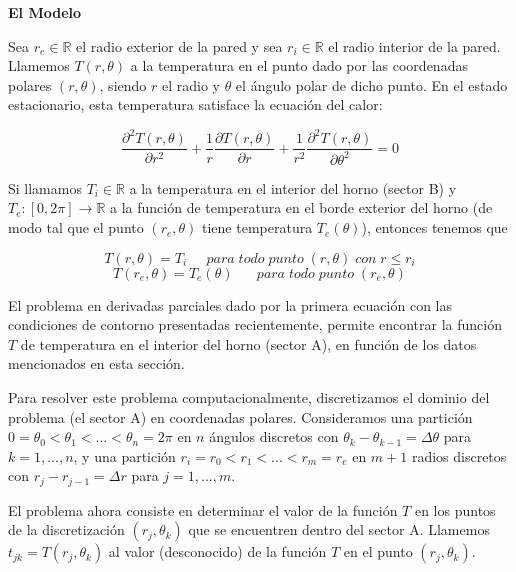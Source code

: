 {\bf El Modelo}

Sea $r_e \in \mathbb{R}$ el radio exterior de la pared y sea $r_i \in \mathbb{R}$ el radio interior de la pared. Llamemos $T(r,\theta)$ a la temperatura en el punto dado por las coordenadas polares $(r,\theta)$, siendo $r$ el radio y $\theta$ el \'angulo polar de dicho punto. En el estado estacionario, esta temperatura satisface la ecuaci\'on del calor:

\begin{equation}\label{calor}
\frac{\partial^2T(r,\theta)}{\partial r^2}+\frac{1}{r}\frac{\partial T(r,\theta)}{\partial r}+\frac{1}{r^2}\frac{\partial^2T(r,\theta)}{\partial \theta^2} = 0 
\end{equation}


Si llamamos $T_i \in \mathbb{R}$ a la temperatura en el interior del horno (sector B) y $T_e : [0,2\pi] \rightarrow \mathbb{R}$ a la funci\'on de temperatura en el borde exterior del horno (de modo tal que el punto $(r_e,\theta)$ tiene temperatura $T_e(\theta)$), entonces tenemos que

\begin{equation}
T(r,\theta) = T_i \;\;\;\;\;para\;todo\;punto\;(r,\theta)\;con\;r\leq r_i
\end{equation}
\begin{equation}
T(r_e,\theta) = T_e(\theta) \;\;\;\;\;\;para\;todo\;punto\;(r_e,\theta)
\end{equation}


El problema en derivadas parciales dado por la primera ecuaci\'on con las condiciones de contorno presentadas recientemente, permite encontrar la funci\'on $T$ de temperatura en el interior del horno (sector A), en funci\'on de los datos mencionados en esta secci\'on.

Para resolver este problema computacionalmente, discretizamos el dominio del problema (el sector A) en coordenadas polares. Consideramos una partici\'on $0 = \theta_0 < \theta_1 < ... < \theta_n = 2\pi$ en $n$ \'angulos discretos con $\theta_k-\theta_{k-1} = \Delta\theta$ para $k = 1,...,n$, y una partici\'on $r_i = r_0 < r_1 < ... < r_m = r_e$ en $m+1$ radios discretos con $r_j - r_{j-1} = \Delta r$ para $j = 1,...,m$.

\medskip

El problema ahora consiste en determinar el valor de la funci\'on $T$ en los puntos de la discretizaci\'on $(r_j,\theta_k)$ que se encuentren dentro del sector A. Llamemos $t_{jk} = T(r_j,\theta_k)$ al valor (desconocido) de la funci\'on $T$ en el punto $(r_j,\theta_k)$.

